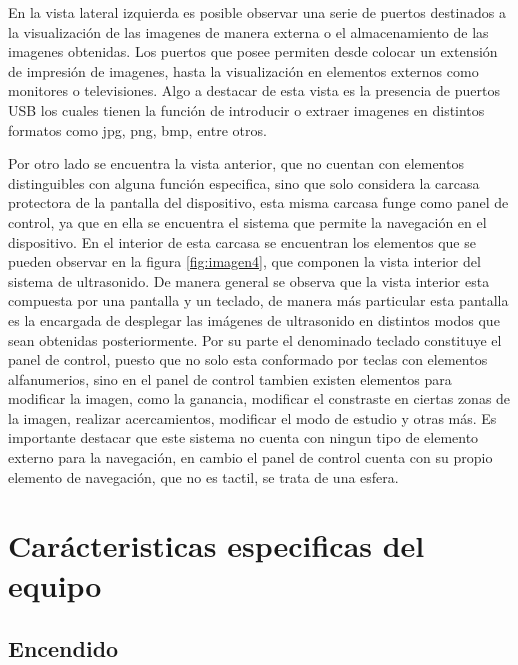 \documentclass[letterpaper,12pt,oneside]{book}
\begin{document}
\vspace{10pt}

En la vista lateral izquierda es posible observar una serie de puertos destinados a la visualización de las imagenes de manera externa o el almacenamiento de las imagenes obtenidas. Los puertos que posee permiten desde colocar un extensión de impresión de imagenes, hasta la visualización en elementos externos como monitores o televisiones. Algo a destacar de esta vista es la presencia de puertos USB los cuales tienen la función de introducir o extraer imagenes en distintos formatos como jpg, png, bmp, entre otros. 

\vspace{10pt}


Por otro lado se encuentra la vista anterior, que no cuentan con elementos distinguibles con alguna función especifica, sino que solo considera la carcasa protectora de la pantalla del dispositivo, esta misma carcasa funge como panel de control, ya que en ella se encuentra el sistema que permite la navegación en el dispositivo. En el interior de esta carcasa se encuentran los elementos que se pueden observar en la figura \ref{fig:imagen4}, que componen la vista interior del sistema de ultrasonido. De manera general se observa que la vista interior esta compuesta por una pantalla y un teclado, de manera más particular esta pantalla es la encargada de desplegar las imágenes de ultrasonido en distintos modos que sean obtenidas posteriormente. Por su parte el denominado teclado constituye el panel de control, puesto que no solo esta conformado por teclas con elementos alfanumerios, sino en el panel de control tambien existen elementos para modificar la imagen, como la ganancia, modificar el constraste en ciertas zonas de la imagen, realizar acercamientos, modificar el modo de estudio y otras más. Es importante destacar que este sistema no cuenta con ningun tipo de elemento externo para la navegación, en cambio el panel de control cuenta con su propio elemento de navegación, que no es tactil, se trata de una esfera. 

\section{Carácteristicas especificas del equipo}

\subsection{Encendido}
\end{document}
